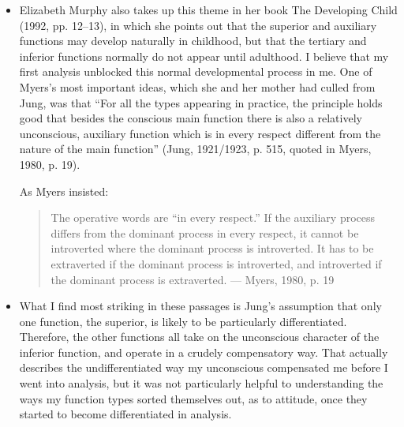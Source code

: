 \begin{itemize}

\item Elizabeth Murphy also takes up this theme in her book The Developing
Child (1992, pp. 12–13), in which she points out that the superior and
auxiliary functions may develop naturally in childhood, but that the tertiary
and inferior functions normally do not appear until adulthood. I believe that
my first analysis unblocked this normal developmental process in me. One of
Myers's most important ideas, which she and her mother had culled from Jung,
was that ``For all the types appearing in practice, the principle holds good
that besides the conscious main function there is also a relatively
unconscious, auxiliary function which is in every respect different from the
nature of the main function'' (Jung, 1921/1923, p. 515, quoted in Myers, 1980,
p. 19).

As Myers insisted:
\begin{quote}
The operative words are ``in every respect.'' If the auxiliary process differs
from the dominant process in every respect, it cannot be introverted where the
dominant process is introverted. It has to be extraverted if the dominant
process is introverted, and introverted if the dominant process is extraverted.
--- Myers, 1980, p. 19
\end{quote}

\item What I find most striking in these passages is Jung's assumption that
only one function, the superior, is likely to be particularly differentiated.
Therefore, the other functions all take on the unconscious character of the
inferior function, and operate in a crudely compensatory way. That actually
describes the undifferentiated way my unconscious compensated me before I went
into analysis, but it was not particularly helpful to understanding the ways my
function types sorted themselves out, as to attitude, once they started to
become differentiated in analysis.


\end{itemize}
